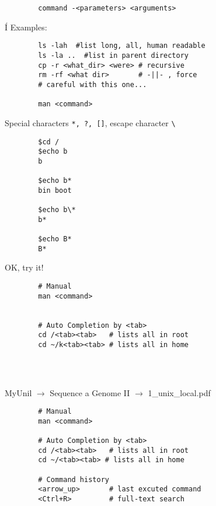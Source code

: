 \documentclass[xcolor=dvipsnames]{beamer}
\begin{document}
\begin{frame}[fragile]
	\begin{verbatim}
		command -<parameters> <arguments>
	\end{verbatim}Í
	Examples:
	\begin{verbatim}
		ls -lah  #list long, all, human readable
		ls -la ..  #list in parent directory
		cp -r <what_dir> <were> # recursive
		rm -rf <what dir>       # -||- , force
		# careful with this one...
		
		man <command>
	\end{verbatim}
\end{frame}

\begin{frame}[fragile]
	\Large
	Special characters \verb!*, ?, []!, escape character \verb!\!
	\begin{verbatim}
		$cd /
		$echo b
		b
		
		$echo b*
		bin boot
		
		$echo b\*
		b*
		
		$echo B*
		B*

	\end{verbatim}
\end{frame}

\begin{frame}[fragile]
	\Huge
	\begin{center}
		OK, try it!	
	\end{center}
	\Large
	\begin{verbatim}
		# Manual	
		man <command>
	
	
		# Auto Completion by <tab>
		cd /<tab><tab>   # lists all in root
		cd ~/k<tab><tab> # lists all in home
		
		
		
	\end{verbatim}
\end{frame}

\begin{frame}[fragile]
	\begin{center}
		MyUnil $\rightarrow$ Sequence a Genome II $\rightarrow$ 1\_unix\_local.pdf
	\end{center}
	\Large
	\begin{verbatim}
		# Manual	
		man <command>
		
		# Auto Completion by <tab>
		cd /<tab><tab>   # lists all in root
		cd ~/<tab><tab> # lists all in home
		
		# Command history
		<arrow_up>       # last excuted command
		<Ctrl+R>         # full-text search
	\end{verbatim}
\end{frame}
\end{document}
